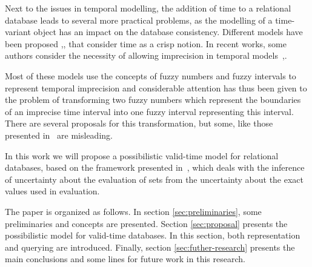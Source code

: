 Next to the issues in temporal modelling, the addition of time to a relational database leads to several more practical problems, as the modelling of a time-variant object has an impact on the database consistency. Different models have been proposed \cite{Jensen91},\cite{Snodgrass84},\cite{Nascimento95} that consider time as a crisp notion. In recent works, some authors consider the necessity of allowing imprecision in temporal models~\cite{Cru97},\cite{Garrido2009}.

Most of these models use the concepts of fuzzy numbers and fuzzy intervals to represent temporal imprecision and considerable attention has thus been given to the problem of transforming two fuzzy numbers which represent the boundaries of an imprecise time interval into one fuzzy interval representing this interval. There are several proposals for this transformation, but some, like those presented in~\cite{Garrido2009} are misleading. 

In this work we will propose a possibilistic valid-time model for relational databases, based on the framework presented in~\cite{Pon11}, which deals with the inference of uncertainty about the evaluation of sets from the uncertainty about the exact values used in evaluation. 

The paper is organized as follows. In section \ref{sec:preliminaries}, some preliminaries and concepts are presented. 
Section \ref{sec:proposal} presents the possibilistic model for valid-time databases. In this section, both representation and querying are introduced.
Finally, section \ref{sec:futher-research} presents the main conclusions and some lines for future work in this research.
